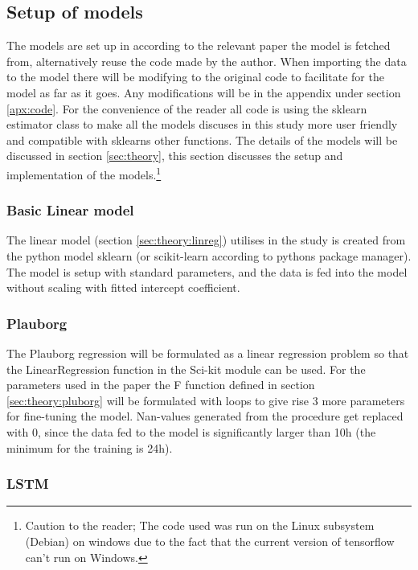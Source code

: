 \subsection{Setup of models}

The models are set up in according to the relevant paper the model is fetched from, alternatively reuse the code made by the author. When importing the data to the model there will be modifying to the original code to facilitate for the model as far as it goes. Any modifications will be in the appendix under section \ref{apx:code}. For the convenience of the reader all code is using the sklearn estimator class to make all the models discuses in this study more user friendly and compatible with sklearns other functions. The details of the models will be discussed in section \ref{sec:theory}, this section discusses the setup and implementation of the models.\footnote{Caution to the reader; The code used was run on the Linux subsystem (Debian) on windows due to the fact that the current version of tensorflow can't run on Windows.}

\subsubsection{Basic Linear model}

The linear model (section \ref{sec:theory:linreg}) utilises in the study is created from the python model sklearn (or scikit-learn according to pythons package manager). The model is setup with standard parameters, and the data is fed into the model without scaling with fitted intercept coefficient. 

\subsubsection{Plauborg}

The Plauborg regression will be formulated as a linear regression problem so that the LinearRegression function in the Sci-kit module can be used. For the parameters used in the paper\cite{plauborg_simple_2002} the F function defined in section \ref{sec:theory:pluborg} will be formulated with loops to give rise 3 more parameters for fine-tuning the model. Nan-values generated from the procedure get replaced with 0, since the data fed to the model is significantly larger than 10h (the minimum for the training is 24h).

\subsubsection{LSTM}

